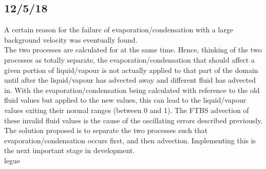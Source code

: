 \documentclass[11pt]{article}
\begin{document}
\subsection{12/5/18}
A certain reason for the failure of evaporation/condensation with a large background velocity was eventually found.\\
The two processes are calculated for at the same time. Hence, thinking of the two processes as totally separate, the evaporation/condensation that should affect a given portion of liquid/vapour is not actually applied to that part of the domain until after the liquid/vapour has advected away and different fluid has advected in. With the evaporation/condensation being calculated with reference to the old fluid values but applied to the new values, this can lead to the liquid/vapour values exiting their normal ranges (between 0 and 1). The FTBS advection of these invalid fluid values is the cause of the oscillating errors described previously.\\
The solution proposed is to separate the two processes such that evaporation/condensation occurs first, and then advection. Implementing this is the next important stage in development.\\
legue %
\end{document}
